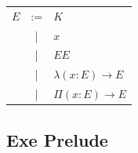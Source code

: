 \documentclass[11pt,oneside]{article}
\begin{document}
\begin{center}
\begin{tabular}{lcl}
      $E$ & :=& $K$ \\
          & | & $x$ \\
          & | & $E E$ \\
          & | & $\lambda (x: E) \rightarrow E$ \\
          & | & $\Pi (x: E) \rightarrow E$ \\
\end{tabular}
\end{center}

\newpage

  \subsection{Exe Prelude}
\vspace{1cm}
\paragraph{}
\end{document}

